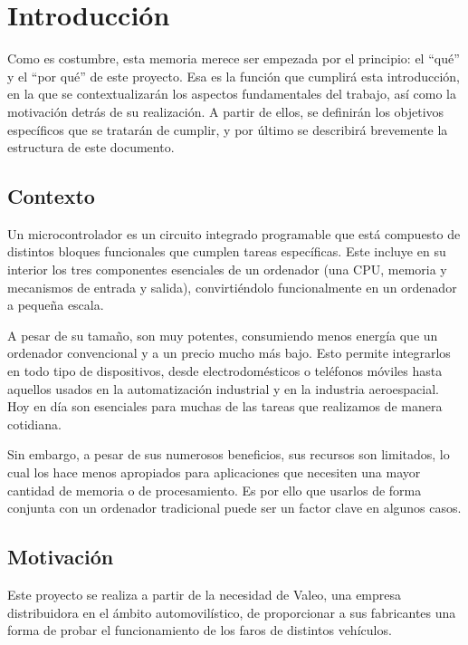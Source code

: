 \chapter{Introducción}
\label{ch:introduccion}

Como es costumbre, esta memoria merece ser empezada por el principio: el ``qué'' y el ``por qué'' de este proyecto. Esa es la función que cumplirá esta introducción, en la que se contextualizarán los aspectos fundamentales del trabajo, así como la motivación detrás de su realización. A partir de ellos, se definirán los objetivos específicos que se tratarán de cumplir, y por último se describirá brevemente la estructura de este documento.

\section{Contexto}

Un microcontrolador es un circuito integrado programable que está compuesto de distintos bloques funcionales que cumplen tareas específicas. Este incluye en su interior los tres componentes esenciales de un ordenador (una CPU, memoria y mecanismos de entrada y salida), convirtiéndolo funcionalmente en un ordenador a pequeña escala.

A pesar de su tamaño, son muy potentes, consumiendo menos energía que un ordenador convencional y a un precio mucho más bajo. Esto permite integrarlos en todo tipo de dispositivos, desde electrodomésticos o teléfonos móviles hasta aquellos usados en la automatización industrial y en la industria aeroespacial. Hoy en día son esenciales para muchas de las tareas que realizamos de manera cotidiana.

Sin embargo, a pesar de sus numerosos beneficios, sus recursos son limitados, lo cual los hace menos apropiados para aplicaciones que necesiten una mayor cantidad de memoria o de procesamiento. Es por ello que usarlos de forma conjunta con un ordenador tradicional puede ser un factor clave en algunos casos.

\section{Motivación}
\label{sec:motivacion}

Este proyecto se realiza a partir de la necesidad de Valeo, una empresa distribuidora en el ámbito automovilístico, de proporcionar a sus fabricantes una forma de probar el funcionamiento de los faros de distintos vehículos.

